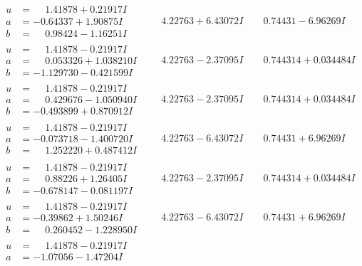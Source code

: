\documentclass[1p]{elsarticle_modified}
\theoremstyle{definition}
\begin{document}
$$\begin{array}{c|c|c}
\begin{aligned}
u &= \phantom{-}1.41878 + 0.21917 I \\
a &= -0.64337 + 1.90875 I \\
b &= \phantom{-}0.98424 - 1.16251 I\end{aligned}
 & \phantom{-}4.22763 + 6.43072 I & \phantom{-}0.74431 - 6.96269 I \\ \hline\begin{aligned}
u &= \phantom{-}1.41878 - 0.21917 I \\
a &= \phantom{-}0.053326 + 1.038210 I \\
b &= -1.129730 - 0.421599 I\end{aligned}
 & \phantom{-}4.22763 - 2.37095 I & \phantom{-}0.744314 + 0.034484 I \\ \hline\begin{aligned}
u &= \phantom{-}1.41878 - 0.21917 I \\
a &= \phantom{-}0.429676 - 1.050940 I \\
b &= -0.493899 + 0.870912 I\end{aligned}
 & \phantom{-}4.22763 - 2.37095 I & \phantom{-}0.744314 + 0.034484 I \\ \hline\begin{aligned}
u &= \phantom{-}1.41878 - 0.21917 I \\
a &= -0.073718 - 1.400720 I \\
b &= \phantom{-}1.252220 + 0.487412 I\end{aligned}
 & \phantom{-}4.22763 - 6.43072 I & \phantom{-}0.74431 + 6.96269 I \\ \hline\begin{aligned}
u &= \phantom{-}1.41878 - 0.21917 I \\
a &= \phantom{-}0.88226 + 1.26405 I \\
b &= -0.678147 - 0.081197 I\end{aligned}
 & \phantom{-}4.22763 - 2.37095 I & \phantom{-}0.744314 + 0.034484 I \\ \hline\begin{aligned}
u &= \phantom{-}1.41878 - 0.21917 I \\
a &= -0.39862 + 1.50246 I \\
b &= \phantom{-}0.260452 - 1.228950 I\end{aligned}
 & \phantom{-}4.22763 - 6.43072 I & \phantom{-}0.74431 + 6.96269 I \\ \hline\begin{aligned}
u &= \phantom{-}1.41878 - 0.21917 I \\
a &= -1.07056 - 1.47204 I \\

\end{aligned}
\end{array}$$
\end{document}

